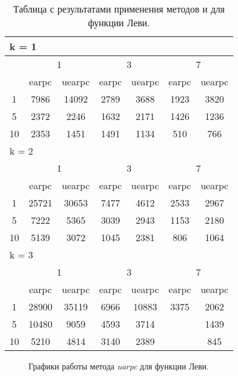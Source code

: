 \begin{table}
  \centering
  \begin{tabular}{|*7{c|}}
    \hline
    \multicolumn{7}{|l|}{k = 1} \\
    \hline
    \multirow{2}{*}{\diagbox{$\mu$}{$\lambda$}} & \multicolumn{2}{c|}{1} & \multicolumn{2}{c|}{3} & \multicolumn{2}{c|}{7} \\
    \cline{2-7}
    & earpc & uearpc & earpc & uearpc & earpc & uearpc \\
    \hline
    1 & 7986 & 14092 & 2789 & 3688 & 1923 & 3820 \\
    \hline
    5 & 2372 & 2246 & 1632 & 2171 & 1426 & 1236 \\
    \hline
    10 & 2353 & 1451 & 1491 & 1134 & 510 & 766 \\
    \hline
    \multicolumn{7}{|l|}{k = 2} \\
    \hline
    \multirow{2}{*}{\diagbox{$\mu$}{$\lambda$}} & \multicolumn{2}{c|}{1} & \multicolumn{2}{c|}{3} & \multicolumn{2}{c|}{7} \\
    \cline{2-7}
    & earpc & uearpc & earpc & uearpc & earpc & uearpc \\
    \hline
    1 & 25721 & 30653 & 7477 & 4612 & 2533 & 2967 \\
    \hline
    5 & 7222 & 5365 & 3039 & 2943 & 1153 & 2180 \\
    \hline
    10 & 5139 & 3072 & 1045 & 2381 & 806 & 1064 \\
    \hline
    \multicolumn{7}{|l|}{k = 3} \\
    \hline
    \multirow{2}{*}{\diagbox{$\mu$}{$\lambda$}} & \multicolumn{2}{c|}{1} & \multicolumn{2}{c|}{3} & \multicolumn{2}{c|}{7} \\
    \cline{2-7}
    & earpc & uearpc & earpc & uearpc & earpc & uearpc \\
    \hline
    1 & 28900 & 35119 & 6966 & 10883 & 3375 & 2062 \\
    \hline
    5 & 10480 & 9059 & 4593 & 3714 & \cellcolor{olive}{594} & 1439 \\
    \hline
    10 & 5210 & 4814 & 3140 & 2389 & \cellcolor{olive}{521} & 845 \\
    \hline
  \end{tabular}
  \captionsetup{justification=centering}
  \caption{Таблица с результатами применения методов  и  для функции Леви.}
\end{table}

\begin{figure}
  \centering
  \caption{ Графики работы метода \textit{uarpc} для функции Леви.}
  \label{uarpc_levi_plot}
\end{figure}

